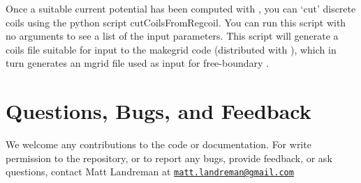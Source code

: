 Once a suitable current potential has been computed with \regcoil, you can `cut' discrete coils
using the python script {\ttfamily cutCoilsFromRegcoil}. You can run this script with no arguments
to see a list of the input parameters. This script will generate a coils file suitable for input to the
{\ttfamily makegrid} code (distributed with \vmec), which in turn generates an mgrid file used as input for free-boundary \vmec.

\section{Questions, Bugs, and Feedback}

We welcome any contributions to the code or documentation.
For write permission to the repository, or to report any bugs, provide feedback, or ask questions, contact Matt Landreman at
\href{mailto:matt.landreman@gmail.com}{\nolinkurl{matt.landreman@gmail.com} }






